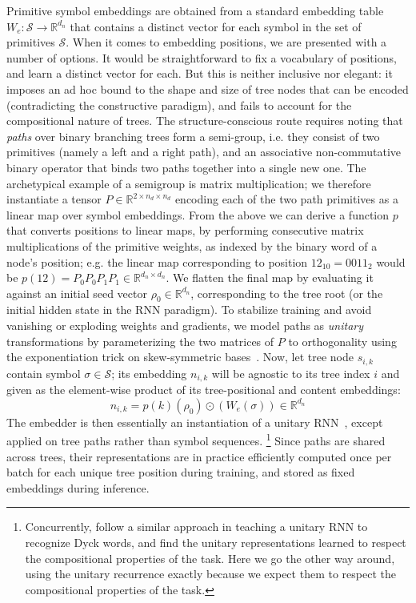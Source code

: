 Primitive symbol embeddings are obtained from a standard embedding table $W_e: \mathcal{S} \to \mathbb{R}^{d_n}$ that contains a distinct vector for each symbol in the set of primitives $\mathcal{S}$. 
When it comes to embedding positions, we are presented with a number of options.
It would be straightforward to fix a vocabulary of positions, and learn a distinct vector for each.
But this is neither inclusive nor elegant: it imposes an ad hoc bound to the shape and size of tree nodes that can be encoded (contradicting the constructive paradigm), and fails to account for the compositional nature of trees.
The structure-conscious route requires noting that \textit{paths} over binary branching trees form a semi-group, i.e. they consist of two primitives (namely a left and a right path), and an associative non-commutative binary operator that binds two paths together into a single new one.
The archetypical example of a semigroup is matrix multiplication; we therefore instantiate a tensor $P \in \mathbb{R}^{2 \times n_d \times n_d}$ encoding each of the two path primitives as a linear map over symbol embeddings.
From the above we can derive a function $p$ that converts positions to linear maps, by performing consecutive matrix multiplications of the primitive weights, as indexed by the binary word of a node's position; e.g. the linear map corresponding to position $12_{10} = 0011_{2}$ would be $p(12) = P_0P_0P_1P_1 \in \mathbb{R}^{d_n \times d_n}$.
We flatten the final map by evaluating it against an initial seed vector $\rho_0 \in \mathbb{R}^{d_n}$, corresponding to the tree root (or the initial hidden state in the RNN paradigm).
To stabilize training and avoid vanishing or exploding weights and gradients, we model paths as \textit{unitary} transformations by parameterizing the two matrices of $P$ to orthogonality using the exponentiation trick on skew-symmetric bases~\cite{bader2019computing,lezcano2019trivializations}.
Now, let tree node $s_{i, k}$ contain symbol $\sigma \in \mathcal{S}$; its embedding $n_{i,k}$ will be agnostic to its tree index $i$ and given as the element-wise product of its tree-positional and content embeddings:
\begin{equation}
n_{i, k} = p(k)(\rho_0) \odot \left(W_e(\sigma)\right) \in \mathbb{R}^{d_n}
\end{equation}
The embedder is then essentially an instantiation of a unitary RNN~\cite{arjovsky2016unitary}, except applied on tree paths rather than symbol sequences.%
	\footnote{Concurrently, \citet{bernardy2022assessing} follow a similar approach in teaching a unitary RNN to recognize Dyck words, and find the unitary representations learned to respect the compositional properties of the task.
	Here we go the other way around, using the unitary recurrence exactly because we expect them to respect the compositional properties of the task.}
Since paths are shared across trees, their representations are in practice efficiently computed once per batch for each unique tree position during training, and stored as fixed embeddings during inference.

